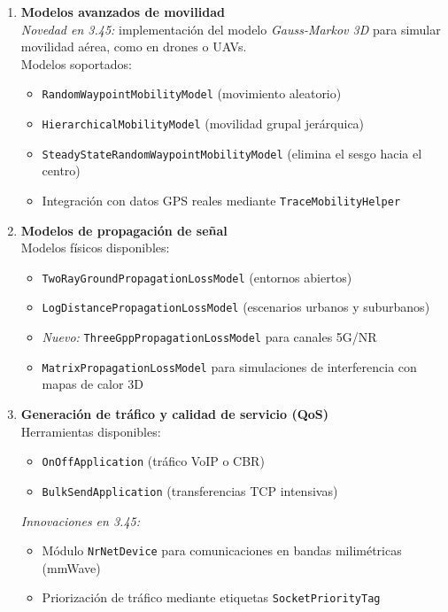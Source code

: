 \documentclass{article}
\begin{document}
\begin{enumerate}
    \item \textbf{Modelos avanzados de movilidad} \\
    \textit{Novedad en 3.45:} implementación del modelo \textit{Gauss-Markov 3D} para simular movilidad aérea, como en drones o UAVs. \\
    Modelos soportados:
    \begin{itemize}
        \item \texttt{RandomWaypointMobilityModel} (movimiento aleatorio)
        \item \texttt{HierarchicalMobilityModel} (movilidad grupal jerárquica)
        \item \texttt{SteadyStateRandomWaypointMobilityModel} (elimina el sesgo hacia el centro)
        \item Integración con datos GPS reales mediante \texttt{TraceMobilityHelper}
    \end{itemize}

    \item \textbf{Modelos de propagación de señal} \\
    Modelos físicos disponibles:
    \begin{itemize}
        \item \texttt{TwoRayGroundPropagationLossModel} (entornos abiertos)
        \item \texttt{LogDistancePropagationLossModel} (escenarios urbanos y suburbanos)
        \item \textit{Nuevo:} \texttt{ThreeGppPropagationLossModel} para canales 5G/NR
        \item \texttt{MatrixPropagationLossModel} para simulaciones de interferencia con mapas de calor 3D
    \end{itemize}

    \item \textbf{Generación de tráfico y calidad de servicio (QoS)} \\
    Herramientas disponibles:
    \begin{itemize}
        \item \texttt{OnOffApplication} (tráfico VoIP o CBR)
        \item \texttt{BulkSendApplication} (transferencias TCP intensivas)
    \end{itemize}
    \textit{Innovaciones en 3.45:}
    \begin{itemize}
        \item Módulo \texttt{NrNetDevice} para comunicaciones en bandas milimétricas (mmWave)
        \item Priorización de tráfico mediante etiquetas \texttt{SocketPriorityTag}
    \end{itemize}


\end{enumerate}
\end{document}
